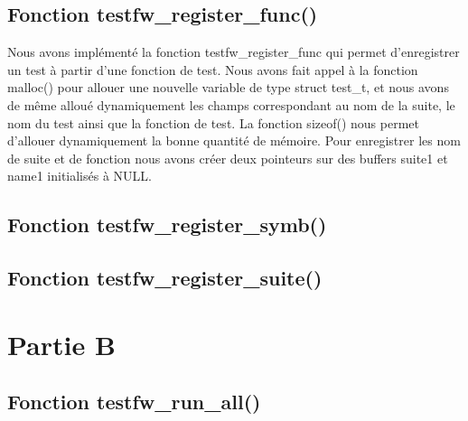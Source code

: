 \documentclass{article}
\begin{document}
\subsection{Fonction testfw\_register\_func()}
Nous avons implémenté la fonction testfw\_register\_func qui permet d'enregistrer un test à partir d'une fonction de test.  Nous avons fait appel à la fonction malloc() pour allouer une nouvelle variable de type struct test\_t, et nous avons de même alloué dynamiquement les champs correspondant au nom de la suite, le nom du test ainsi que la fonction de test.  La fonction sizeof() nous permet d'allouer dynamiquement la bonne quantité de mémoire.  Pour enregistrer les nom de suite et de fonction nous avons créer deux pointeurs sur des buffers suite1 et name1 initialisés à NULL. 

\subsection{Fonction testfw\_register\_symb()}
\subsection{Fonction testfw\_register\_suite()}
 
\section{Partie B}
\subsection{Fonction testfw\_run\_all()}
  
\end{document}

